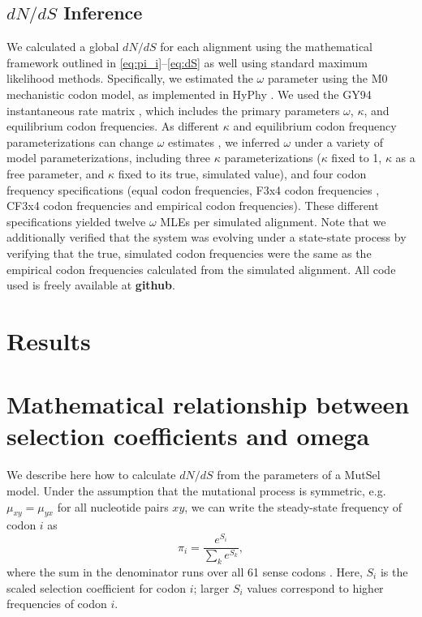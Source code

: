 \documentclass[11pt]{article}
\begin{document}
\subsection*{$dN/dS$ Inference}
We calculated a global $dN/dS$ for each alignment using the mathematical framework outlined in \eqref{eq:pi_i}--\eqref{eq:dS} as well using standard maximum likelihood methods. Specifically, we estimated the $\omega$ parameter using the M0 mechanistic codon model\cite{Yangetal2000}, as implemented in HyPhy \cite{KosakovskyPondetal2005}. We used the GY94 instantaneous rate matrix \cite{GoldmanYang1994,NielsenYang1998}, which includes the primary parameters $\omega$, $\kappa$, and equilibrium codon frequencies. As different $\kappa$ and equilibrium codon frequency parameterizations can change $\omega$ estimates \cite{YN00, Yang2006, ZhangYu2006}, we inferred $\omega$ under a variety of model parameterizations, including three $\kappa$ parameterizations ($\kappa$ fixed to 1, $\kappa$ as a free parameter, and $\kappa$ fixed to its true, simulated value), and four codon frequency specifications (equal codon frequencies,  F3x4 codon frequencies \cite{MuseGaut1994}, CF3x4 codon frequencies \cite{Pond2010} and empirical codon frequencies). These different specifications yielded twelve $\omega$ MLEs per simulated alignment. Note that we additionally verified that the system was evolving under a state-state process by verifying that the true, simulated codon frequencies were the same as the empirical codon frequencies calculated from the simulated alignment. All code used is freely available at \textbf{github}. 



\section*{Results}


\section*{Mathematical relationship between selection coefficients and omega}


We describe here how to calculate $dN/dS$ from the parameters of a MutSel model. Under the assumption that the mutational process is symmetric, e.g. $\mu_{xy}=\mu_{yx}$ for all nucleotide pairs $xy$, we can write the steady-state frequency of codon $i$ as 
\begin{equation}\label{eq:pi_i}
 \pi_i=\frac{e^{S_i}}{\sum_k e^{S_k}},
\end{equation}
where the sum in the denominator runs over all 61 sense codons \cite{SellaHirsh2005}. Here, $S_i$ is the scaled selection coefficient for codon $i$; larger $S_i$ values correspond to higher frequencies of codon $i$.
\end{document}
